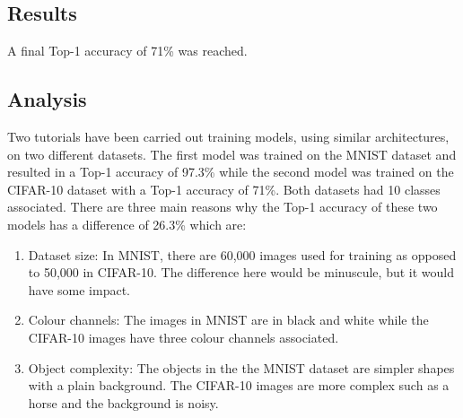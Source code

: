 \tocless\subsection{Results}
A final Top-1 accuracy of 71\% was reached.

\tocless\subsection{Analysis}
Two tutorials have been carried out training models, using similar architectures, on two different datasets.
The first model was trained on the MNIST dataset and resulted in a Top-1 accuracy of 97.3\% while the second model was trained on the CIFAR-10 dataset with a Top-1 accuracy of 71\%.
Both datasets had 10 classes associated.
There are three main reasons why the Top-1 accuracy of these two models has a difference of 26.3\% which are:
\begin{enumerate}
    \item{Dataset size: In MNIST, there are 60,000 images used for training as opposed to 50,000 in CIFAR-10. The difference here would be minuscule, but it would have some impact.}
    \item{Colour channels: The images in MNIST are in black and white while the CIFAR-10 images have three colour channels associated.}
    \item{Object complexity: The objects in the the MNIST dataset are simpler shapes with a plain background. The CIFAR-10 images are more complex such as a horse and the background is noisy.}
\end{enumerate}

\clearpage
